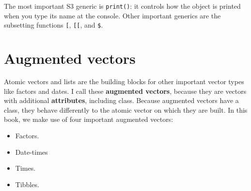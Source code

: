 \documentclass[]{book}
\newenvironment{Shaded}{\begin{snugshade}}{\end{snugshade}}
\newcommand{\KeywordTok}[1]{\textcolor[rgb]{0.13,0.29,0.53}{\textbf{{#1}}}}
\newcommand{\StringTok}[1]{\textcolor[rgb]{0.31,0.60,0.02}{{#1}}}
\newcommand{\CommentTok}[1]{\textcolor[rgb]{0.56,0.35,0.01}{\textit{{#1}}}}
\newcommand{\NormalTok}[1]{{#1}}
\providecommand{\tightlist}{%
  \setlength{\itemsep}{0pt}\setlength{\parskip}{0pt}}
\begin{document}
\begin{Shaded}
\end{Shaded}

The most important S3 generic is \texttt{print()}: it controls how the
object is printed when you type its name at the console. Other important
generics are the subsetting functions \texttt{{[}}, \texttt{{[}{[}}, and
\texttt{\$}.

\section{Augmented vectors}\label{augmented-vectors}

Atomic vectors and lists are the building blocks for other important
vector types like factors and dates. I call these \textbf{augmented
vectors}, because they are vectors with additional \textbf{attributes},
including class. Because augmented vectors have a class, they behave
differently to the atomic vector on which they are built. In this book,
we make use of four important augmented vectors:

\begin{itemize}
\tightlist
\item
  Factors.
\item
  Date-times
\item
  Times.
\item
  Tibbles.
\end{itemize}
\end{document}
